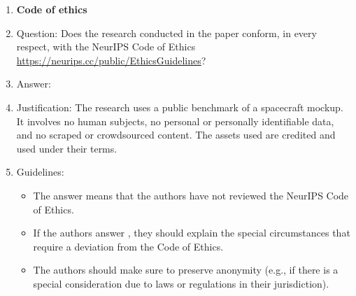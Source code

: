 \begin{enumerate}
\item {\bf Code of ethics}
    \item[] Question: Does the research conducted in the paper conform, in every respect, with the NeurIPS Code of Ethics \url{https://neurips.cc/public/EthicsGuidelines}?
    \item[] Answer: \answerYes{}
    \item[] Justification: The research uses a public benchmark of a spacecraft mockup. It involves no human
    subjects, no personal or personally identifiable data, and no scraped or crowdsourced
    content. The assets used are credited and used under their terms.
    \item[] Guidelines:
    \begin{itemize}
        \item The answer \answerNA{} means that the authors have not reviewed the NeurIPS Code of Ethics.
        \item If the authors answer \answerNo, they should explain the special circumstances that require a deviation from the Code of Ethics.
        \item The authors should make sure to preserve anonymity (e.g., if there is a special consideration due to laws or regulations in their jurisdiction).
    \end{itemize}



\end{enumerate}
